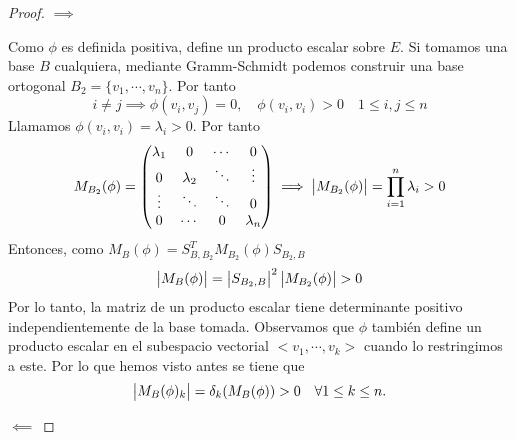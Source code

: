 \begin{proof}
	$\implies$
	
	Como $\phi$ es definida positiva, define un producto escalar
	sobre $E$. Si tomamos una base $B$ cualquiera, mediante
	Gramm-Schmidt podemos construir una base ortogonal
	$B_2 = \{v_1, \cdots, v_n \}$. Por tanto
	\[
	i \neq j \implies \phi(v_i, v_j) = 0, \quad \phi(v_i,v_i) 
	> 0 \quad 1 \leq i, j \leq n
	\]
	Llamamos $\phi(v_i, v_i) = \lambda_i > 0$. Por tanto
	\[
	M_{B_2}(\phi) = \begin{pmatrix}
	\lambda_1 & 0 & \cdots & 0 \\
	0 & \lambda_2 & \ddots & \vdots \\
	\vdots & \ddots & \ddots & 0 \\
	0 & \cdots & 0 & \lambda_n
	\end{pmatrix} \implies \begin{vmatrix}M_{B_2}(\phi)\end{vmatrix} =
	\prod_{i=1}^{n} \lambda_i > 0
	\]
	Entonces, como $M_B(\phi) = S_{B,B_2}^TM_{B_2}(\phi)S_{B_2,B}$
	\[
	\begin{vmatrix}M_B(\phi)\end{vmatrix} = \begin{vmatrix}S_{B_2,B}\end{vmatrix}^2
	\begin{vmatrix}M_{B_2}(\phi)\end{vmatrix} > 0
	\]
	Por lo tanto, la matriz de un producto escalar tiene
	determinante positivo independientemente de la base tomada.
	Observamos que $\phi$ también define un producto escalar en
	el subespacio vectorial $<v_1,\cdots,v_k>$ cuando lo
	restringimos a este. Por lo que hemos visto antes se tiene que
	\[
	\begin{vmatrix}M_B(\phi)_k\end{vmatrix} = \delta_k(M_B(\phi)) > 0
	\quad \forall 1 \leq k \leq n.
	\]
	
	\noindent $\impliedby$
	

\end{proof}
